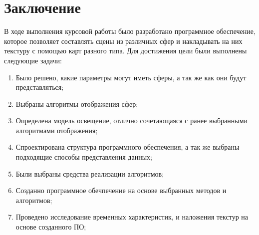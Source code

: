 \chapter*{Заключение}
В ходе выполнения курсовой работы было разработано программное обеспечение, которое позволяет составлять сцены из различных сфер и накладывать на них текстуру с помощью карт разного типа.
Для достижения цели были выполнены следующие задачи:
\begin{enumerate}[label=\arabic*)]
    \item Было решено, какие параметры могут иметь сферы, а так же как они будут представляться;
    \item Выбраны алгоритмы отображения сфер;
    \item Определена модель освещение, отлично сочетающаяся с ранее выбранными алгоритмами отображения;
    \item Спроектирована структура программного обеспечения, а так же выбраны подходящие способы представления данных;
    \item Были выбраны средства реализации алгоритмов;
    \item Созданно программное обечпечение на основе выбранных методов и алгоритмов;
    \item Проведено исследование временных характеристик, и наложения текстур на основе созданного ПО;
\end{enumerate}
